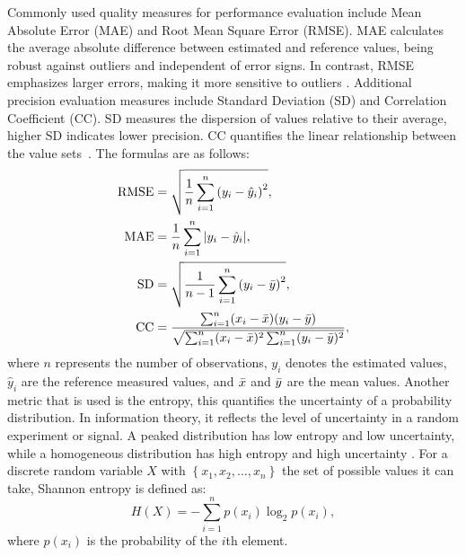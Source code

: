 \documentclass{article}
\begin{document}
Commonly used quality measures for performance evaluation include Mean Absolute Error (MAE) and Root Mean Square Error (RMSE). MAE calculates the average absolute difference between estimated and reference values, being robust against outliers and independent of error signs. In contrast, RMSE emphasizes larger errors, making it more sensitive to outliers \cite{Ritter2013}. Additional precision evaluation measures include Standard Deviation (SD) and Correlation Coefficient (CC). SD measures the dispersion of values relative to their average, higher SD indicates lower precision. CC quantifies the linear relationship between the value sets~\cite{Vijayaraj}. The formulas are as follows:
\begin{align*}
	\text{RMSE} &=\sqrt{\frac{1}{n}\sum_{i=1}^{n}\left(y_i-\hat{y}_i\right)^2},\\
	\text{MAE} &=\frac{1}{n}\sum_{i=1}^{n}|y_i-\hat{y}_i|,\\
	\text{SD} &=\sqrt{\frac{1}{n-1}\sum_{i=1}^{n}\left(y_i-\bar{y}\right)^2},\\
\text{CC}&=  \frac{\sum_{i=1}^{n}(x_i-\Bar{x})(y_i-\Bar{y})}{\sqrt{\sum_{i=1}^{n}(x_i-\Bar{x})^2\sum_{i=1}^{n}(y_i-\Bar{y})^2}},
\end{align*}
where $n$ represents the number of observations, $y_i$ denotes the estimated values, $\hat{y}_i$ are the reference measured values, and  $\Bar{x}$ and $\Bar{y}$ are the mean values.
Another metric that is used is the entropy, this quantifies the uncertainty of a probability distribution. In information theory, it reflects the level of uncertainty in a random experiment or signal. A peaked distribution has low entropy and low uncertainty, while a homogeneous distribution has high entropy and high uncertainty \cite{Mays2002}. For a discrete random variable $X$ with $\left\{x_1, x_2, \ldots, x_n\right\}$ the set of possible values it can take, Shannon entropy is defined as:
\begin{equation}
	H(X)=-\sum_{i=1}^{n}p(x_i)\log_2p(x_i),
	\label{eq:H}
\end{equation}
where $p(x_i)$ is the probability of the $i$th element.
\end{document}

